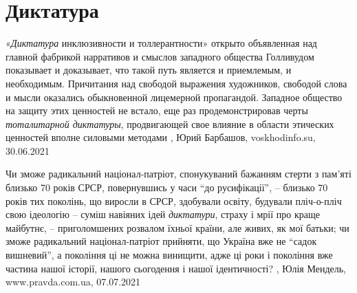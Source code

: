  
 
 
 
 
\chapter{Диктатура}

«\emph{Диктатура} инклюзивности и толлерантности» открыто объявленная над главной
фабрикой нарративов и смыслов западного общества Голливудом показывает и
доказывает, что такой путь является и приемлемым, и необходимым. Причитания над
свободой выражения художников, свободой слова и мысли оказались обыкновенной
лицемерной пропагандой. Западное общество на защиту этих ценностей не встало,
еще раз продемонстрировав черты \emph{тоталитарной диктатуры}, продвигающей свое
влияние в области этических ценностей вполне силовыми методами
, 
Юрий Барбашов, voskhodinfo.su, 30.06.2021

Чи зможе радикальний націонал-патріот, спонукуваний бажанням стерти з пам’яті
близько 70 років СРСР, повернувшись у часи \enquote{до русифікації}, – близько 70 років
тих поколінь, що виросли в СРСР, здобували освіту, будували пліч-о-пліч свою
ідеологію – суміш навіяних ідей \emph{диктатури}, страху і мрії про краще майбутнє, –
приголомшених розвалом їхньої країни, але живих, як мої батьки; чи зможе
радикальний націонал-патріот прийняти, що Україна вже не \enquote{садок вишневий}, а
покоління ці не можна винищити, адже ці роки і покоління вже частина нашої
історії, нашого сьогодення і нашої ідентичності?
, 
Юлія Мендель, www.pravda.com.ua, 07.07.2021
